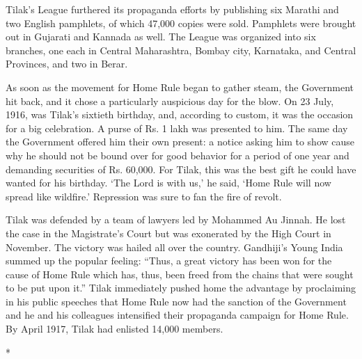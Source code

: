 \begin{multicols}{2}
Tilak's League furthered its propaganda efforts by publishing six Marathi and two English pamphlets, of which 47,000 copies were sold. Pamphlets were brought out in Gujarati and Kannada as well. The League was organized into six branches, one each in Central Maharashtra, Bombay city, Karnataka, and Central Provinces, and two in Berar.

As soon as the movement for Home Rule began to gather steam, the Government hit back, and it chose a particularly auspicious day for the blow. On 23 July, 1916, was Tilak's sixtieth birthday, and, according to custom, it was the occasion for a big celebration. A purse of Rs. 1 lakh was presented to him. The same day the Government offered him their own present: a notice asking him to show cause why he should not be bound over for good behavior for a period of one year and demanding securities of Rs. 60,000. For Tilak, this was the best gift he could have wanted for his birthday. `The Lord is with us,' he said, `Home Rule will now spread like wildfire.' Repression was sure to fan the fire of revolt.

Tilak was defended by a team of lawyers led by Mohammed Au Jinnah. He lost the case in the Magistrate's Court but was exonerated by the High Court in November. The victory was hailed all over the country. Gandhiji's Young India summed up the popular feeling: ``Thus, a great victory has been won for the cause of Home Rule which has, thus, been freed from the chains that were sought to be put upon it.'' Tilak immediately pushed home the advantage by proclaiming in his public speeches that Home Rule now had the sanction of the Government and he and his colleagues intensified their propaganda campaign for Home Rule. By April 1917, Tilak had enlisted 14,000 members.

\begin{center}*\end{center}

\paragraph*{}


\end{multicols}
